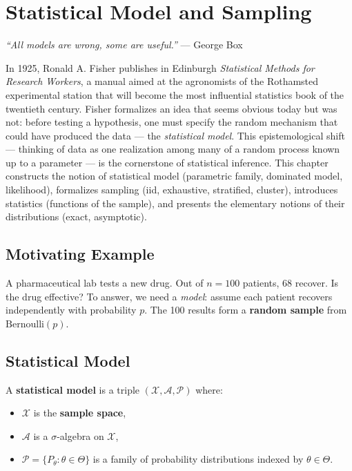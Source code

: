 \chapter{Statistical Model and Sampling}
\label{ch:model}

\begin{center}
\textit{``All models are wrong, some are useful.''} --- George Box
\end{center}

In 1925, Ronald A. Fisher publishes in Edinburgh \emph{Statistical Methods for Research Workers}, a manual aimed at the agronomists of the Rothamsted experimental station that will become the most influential statistics book of the twentieth century. Fisher formalizes an idea that seems obvious today but was not: before testing a hypothesis, one must specify the random mechanism that could have produced the data --- the \emph{statistical model}. This epistemological shift --- thinking of data as one realization among many of a random process known up to a parameter --- is the cornerstone of statistical inference. This chapter constructs the notion of statistical model (parametric family, dominated model, likelihood), formalizes sampling (iid, exhaustive, stratified, cluster), introduces statistics (functions of the sample), and presents the elementary notions of their distributions (exact, asymptotic).

\section{Motivating Example}

A pharmaceutical lab tests a new drug. Out of $n=100$ patients, 68 recover. Is the drug effective? To answer, we need a \emph{model}: assume each patient recovers independently with probability $p$. The 100 results form a \textbf{random sample} from $\mathrm{Bernoulli}(p)$.

\section{Statistical Model}

\begin{definition}
A \textbf{statistical model} is a triple $(\mathcal{X}, \mathcal{A}, \mathcal{P})$ where:
\begin{itemize}
\item $\mathcal{X}$ is the \textbf{sample space},
\item $\mathcal{A}$ is a $\sigma$-algebra on $\mathcal{X}$,
\item $\mathcal{P} = \{P_\theta : \theta\in\Theta\}$ is a family of probability distributions indexed by $\theta\in\Theta$.
\end{itemize}
\end{definition}

